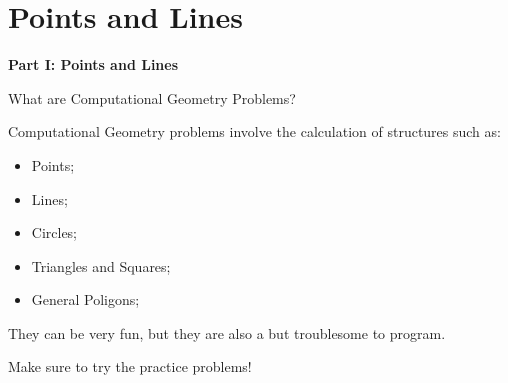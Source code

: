 \section{Points and Lines}

\begin{frame}{}
  \begin{center}
    {\bf Part I: Points and Lines}
  \end{center}
\end{frame}

\begin{frame}{What are Computational Geometry Problems?}

  Computational Geometry problems involve the calculation of structures such as:
  \begin{itemize}
    \item Points;
    \item Lines;
    \item Circles;
    \item Triangles and Squares;
    \item General Poligons;
  \end{itemize}\bigskip

  They can be very fun, but they are also a but troublesome to program.

  Make sure to try the practice problems!

\end{frame}


